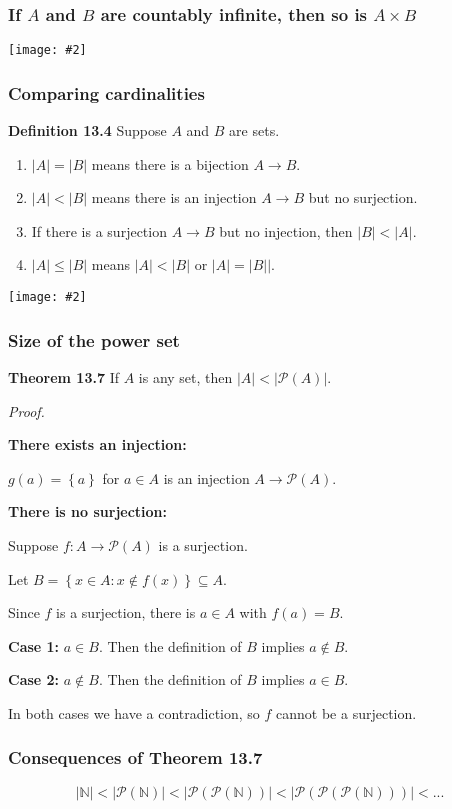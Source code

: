 \documentclass{beamer}
\newcommand{\set}[1]{\ensuremath{\left\{ #1 \right\}}}
\newcommand{\nats}{\ensuremath{\mathbb{N}}}
\newcommand{\grf}[2]{\centerline{\texttt{[image: \#2]}}}
\newcommand{\bfr}[1]{\begin{frame}[fragile]\frametitle{{ #1 }}}
\begin{document}
\bfr{If $A$ and $B$ are countably infinite, then so is $A\times B$}
\grf{0.7}{atimesb}
\end{frame}

\bfr{Comparing cardinalities}

{\bf Definition 13.4}  Suppose $A$ and $B$ are sets.
\begin{enumerate}
\item $|A| = |B|$ means there is a bijection $A\rightarrow B$.
\item $|A| < |B|$ means there is an injection $A\rightarrow B$
  but no surjection.
\item If there is a surjection $A\rightarrow B$ but no injection,
  then $|B| < |A|$.
\item $|A| \leq |B|$ means $|A| < |B|$ or $|A| = |B||$.
\end{enumerate}
\vfill

\grf{1.0}{nobijection}
\end{frame}

\bfr{Size of the power set}

{\bf Theorem 13.7}  If $A$ is any set, then $|A| < |\mathcal{P}(A)|$.

\vfill

{\it Proof.}

{\bf There exists an injection:}

$g(a) = \set{a}$ for $a\in A$ is an injection $A\rightarrow
\mathcal{P}(A)$.

\vfill

{\bf There is no surjection:}

Suppose $f:A\rightarrow\mathcal{P}(A)$ is a surjection.

Let $B = \set{x\in A : x\not\in f(x)} \subseteq A$.

Since $f$ is a surjection, there is $a\in A$ with $f(a) = B$.

{\bf Case 1:} $a\in B$.  Then the definition of $B$ implies $a\not\in
B$.

{\bf Case 2:} $a\not\in B$.  Then the definition of $B$ implies $a\in
B$.

In both cases we have a contradiction, so $f$ cannot be a surjection.
\end{frame}

\bfr{Consequences of Theorem 13.7}

\[
|\nats| < |\mathcal{P}(\nats)|
< |\mathcal{P}(\mathcal{P}(\nats))|
< |\mathcal{P}(\mathcal{P}(\mathcal{P}(\nats)))|
< ...
\]


\end{frame}
\end{document}
